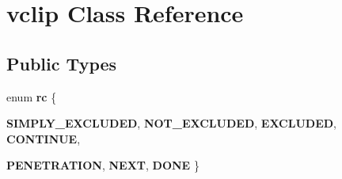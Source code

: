 \hypertarget{classvclip}{
\section{vclip Class Reference}
\label{classvclip}
}
\subsection*{Public Types}
\begin{DoxyCompactItemize}
\item 
enum {\bfseries rc} \{ \par
{\bfseries SIMPLY\_\-EXCLUDED}, 
{\bfseries NOT\_\-EXCLUDED}, 
{\bfseries EXCLUDED}, 
{\bfseries CONTINUE}, 
\par
{\bfseries PENETRATION}, 
{\bfseries NEXT}, 
{\bfseries DONE}
 \}
\end{DoxyCompactItemize}
